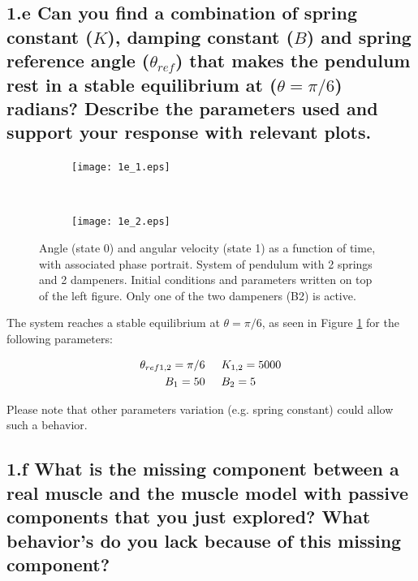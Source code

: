 \documentclass{cmc}
\begin{document}
\subsection*{1.e Can you find a combination of spring constant ($K$),
  damping constant ($B$) and spring reference angle ($\theta_{ref}$) that
  makes the pendulum rest in a stable equilibrium at
  ($\theta = \pi/6$) radians? Describe the parameters used and support
  your response with relevant plots.}

\begin{figure}[H]
    \centering
    \begin{subfigure}[b]{0.5\textwidth}
        \centering
        \texttt{[image: 1e\_1.eps]}
    \end{subfigure}%
    ~
    \begin{subfigure}[b]{0.5\textwidth}
        \centering
        \texttt{[image: 1e\_2.eps]}
    \end{subfigure}
    \caption{Angle (state 0) and angular velocity (state 1) as a function of time, with associated phase portrait. System of pendulum with 2 springs and 2 dampeners. Initial conditions and parameters written on top of the left figure. Only one of the two dampeners (B2) is active.}
    \label{figure:1e}
\end{figure}

The system reaches a stable equilibrium at $\theta = \pi/6$, as seen in Figure \ref{figure:1e} for the following parameters:

\begin{equation}
\begin{split}
\theta_{ref1,2} = \pi/6 \hspace{2.5mm} & \hspace{2.5mm} K_{1,2} = 5000\\
B_{1} = 50 \hspace{2.5mm} & \hspace{2.5mm} B_{2} = 5
\end{split}
\end{equation}

Please note that other parameters variation (e.g. spring constant) could allow such a behavior.

\subsection*{1.f What is the missing component between a real muscle
  and the muscle model with passive components that you just
  explored? What behavior's do you lack because of this missing component?}
\end{document}
